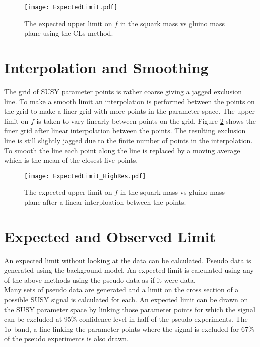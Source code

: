 \begin{figure}
\begin{center}
\texttt{[image: ExpectedLimit.pdf]}
\end{center}
\caption{The expected upper limit on $f$ in the squark mass vs gluino mass plane 
using the CLs method. }
\label{fig:limit}
\end{figure}

\section{Interpolation and Smoothing}

The grid of SUSY parameter points is rather coarse giving a jagged exclusion
line. To make a smooth limit an interpolation is performed between the points 
on the grid to make a finer grid with more points in the parameter space. The 
upper limit on $f$ is taken to vary linearly between points on the grid. Figure
\ref{fig:interpolation} shows the finer grid after linear interpolation between
the points. The resulting exclusion line is still slightly jagged due to the
finite number of points in the interpolation. To smooth the line each point
along the line is replaced by a moving average which is the mean of the closest 
five points.

\begin{figure}
\begin{center}
\texttt{[image: ExpectedLimit\_HighRes.pdf]}
\end{center}
\caption{The expected upper limit on $f$ in the squark mass vs gluino mass plane 
after a linear interploation between the points. }
\label{fig:interpolation}
\end{figure}

\section{Expected and Observed Limit}

An expected limit without looking at the data can be calculated. Pseudo data is
generated using the background model. An expected limit is calculated using any
of the above methods using the pseudo data as if it were data. \\

Many sets of pseudo data are generated and a limit on the cross section of a 
possible SUSY signal is calculated for each. An expected limit can be drawn on 
the SUSY parameter space by linking those parameter points for which the signal 
can be excluded at 95\% confidence level in half of the pseudo experiments. The 
$1 \sigma$ band, a line linking the parameter points where the signal is 
excluded for 67\% of the pseudo experiments is also drawn. \\

